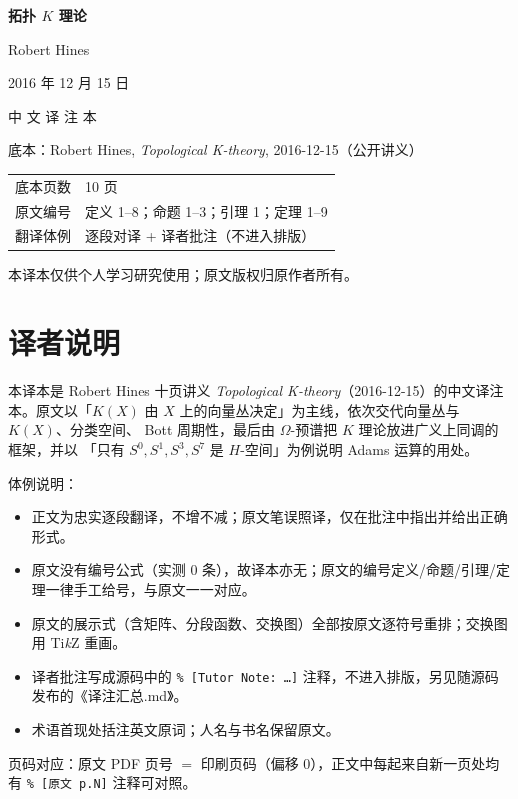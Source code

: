\begin{titlepage}
\centering
\vspace*{3.2cm}

{\Huge\bfseries 拓扑 $K$ 理论\par}
\vspace{0.8cm}
{\Large Robert Hines\par}
\vspace{0.5cm}
{\large 2016 年 12 月 15 日\par}

\vspace{2.2cm}
{\LARGE 中 文 译 注 本\par}
\vspace{0.6cm}
{\normalsize 底本：Robert Hines, \emph{Topological K-theory}, 2016-12-15（公开讲义）\par}

\vfill
{\small
\begin{tabular}{rl}
底本页数 & 10 页 \\
原文编号 & 定义 1--8；命题 1--3；引理 1；定理 1--9 \\
翻译体例 & 逐段对译 + 译者批注（不进入排版） \\
\end{tabular}\par}
\vspace{1.5cm}
{\small 本译本仅供个人学习研究使用；原文版权归原作者所有。\par}
\end{titlepage}


\thispagestyle{empty}
\section*{译者说明}

本译本是 Robert Hines 十页讲义 \emph{Topological K-theory}（2016-12-15）的中文译注本。原文以「$K(X)$ 由 $X$ 上的向量丛决定」为主线，依次交代向量丛与 $K(X)$、分类空间、
Bott 周期性，最后由 $\Omega$-预谱把 $K$ 理论放进广义上同调的框架，并以
「只有 $S^0,S^1,S^3,S^7$ 是 $H$-空间」为例说明 Adams 运算的用处。

体例说明：
\begin{itemize}[leftmargin=1.6em,itemsep=2pt]
  \item 正文为忠实逐段翻译，不增不减；原文笔误照译，仅在批注中指出并给出正确形式。
  \item 原文没有编号公式（实测 0 条），故译本亦无；原文的编号定义/命题/引理/定理一律手工给号，与原文一一对应。
  \item 原文的展示式（含矩阵、分段函数、交换图）全部按原文逐符号重排；交换图用 Ti\emph{k}Z 重画。
  \item 译者批注写成源码中的 \verb|% [Tutor Note: …]| 注释，不进入排版，另见随源码发布的《译注汇总.md》。
  \item 术语首现处括注英文原词；人名与书名保留原文。
\end{itemize}

\vspace{0.6em}
\noindent 页码对应：原文 PDF 页号 $=$ 印刷页码（偏移 0），正文中每起来自新一页处均有
\verb|% [原文 p.N]| 注释可对照。

\clearpage
\tableofcontents
\clearpage
